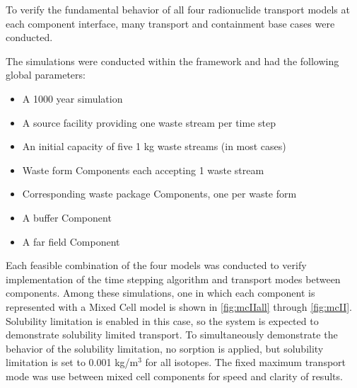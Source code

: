 
To verify the fundamental behavior of all four \Cyder radionuclide transport models at
each component interface, many transport and containment base cases were
conducted.

The simulations were conducted within the \Cyclus framework and had the
following global parameters:

\begin{itemize}
\item{A 1000 year simulation}
\item{A source facility providing one waste stream per time step}
\item{An initial capacity of five 1 kg waste streams (in most cases)}
\item{Waste form Components each accepting 1 waste stream}
\item{Corresponding waste package Components, one per waste form}
\item{A buffer Component}
\item{A far field Component}

\end{itemize}


Each feasible combination of the four models was conducted to verify
implementation of the time stepping algorithm and transport modes between
components. Among these simulations, one in which each component is represented with a Mixed
Cell model is shown in \ref{fig:mcIIall} through \ref{fig:mcII}.  Solubility
limitation is enabled in this case, so the system is expected to demonstrate
solubility limited transport.  To simultaneously demonstrate the behavior of
the solubility limitation, no sorption is applied, but solubility limitation is
set to 0.001 kg/m$^3$ for all isotopes.  The fixed maximum transport mode was
use between mixed cell components for speed and clarity of results.



\FloatBarrier


